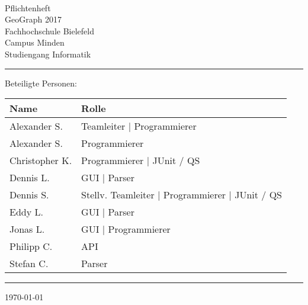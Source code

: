 


\begin{titlepage}
   \mbox{}\vspace{5\baselineskip}\\
   \sffamily\huge
   \centering
   {\Huge Pflichtenheft} \\
   \normalsize GeoGraph 2017
   \vspace{3\baselineskip}\\
   \rmfamily\Large
  Fachhochschule Bielefeld \\
  Campus Minden \\
  Studiengang Informatik
   \vspace{1\baselineskip}\\
\noindent\rule{15cm}{0.3pt}
Beteiligte Personen:
\begin{table}[H]
	\tablestyle
	\begin{tabular}{*{2}{v{0.45\textwidth}}}
		\hline
		\textbf{Name} &
		\textbf{Rolle} \tabularnewline
		\hline
		Alexander S. & Teamleiter | Programmierer\tabularnewline
		Alexander S. & Programmierer\tabularnewline
		Christopher K. & Programmierer | JUnit / QS\tabularnewline
		Dennis L. & GUI | Parser\tabularnewline
		Dennis S.  &  Stellv. Teamleiter | Programmierer | JUnit / QS\tabularnewline
		Eddy L. & GUI | Parser\tabularnewline
		Jonas L. & GUI | Programmierer\tabularnewline
		Philipp C.  & API \tabularnewline
		Stefan C. & Parser\tabularnewline
	\end{tabular}
\end{table}
   \noindent\rule{15cm}{0.4pt}

   \today
\end{titlepage}

